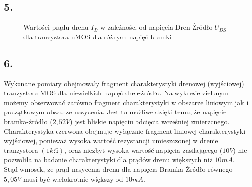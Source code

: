 \documentclass[polish,a4paper]{article}
\begin{document}
\subsection*{5.}
\begin{figure}[!h]
\centering
{}
\caption{Wartości prądu drenu $I_D$ w zależności od napięcia Dren-Źródło $U_{DS}$ dla tranzystora nMOS dla różnych napięć bramki}
\label{fig:wykres3}
\end{figure}

\subsection*{6.}
Wykonane pomiary obejmowały fragment charakterystyki drenowej (wyjściowej) tranzystora MOS dla niewielkich napięć dren-źródło. Na wykresie zielonym możemy obserwować zarówno fragment charakterystyki w obszarze liniowym jak i początkowym obszarze nasycenia. Jest to możliwe dzięki temu, że napięcie bramka-źródło ($2,52V$) jest bliskie napięciu odcięcia wcześniej zmierzonego. Charakterystyka czerwona obejmuje wyłącznie fragment liniowej charakterystyki wyjściowej, ponieważ wysoka wartość rezystancji umieszczonej w drenie tranzystora $(1k\Omega)$, oraz niezbyt wysoka wartość napięcia zasilającego ($10V$) nie pozwoliła na badanie charakterystyki dla prądów drenu większych niż $10mA$. Stąd wniosek, że prąd nasycenia drenu dla napięcia Bramka-Źródło równego $5,05V$ musi być wielokrotnie większy od $10mA$.
\end{document}
